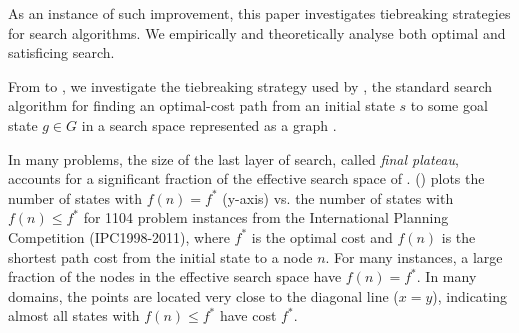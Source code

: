 As an instance of such improvement, this paper investigates tiebreaking
strategies for search algorithms. We empirically and theoretically
analyse both optimal and satisficing search.


From  to , we investigate
the tiebreaking strategy used by \astar, the standard search algorithm
for finding an optimal-cost path from an initial state $s$ to some goal
state $g \in G$ in a search space represented as a graph
\cite{hart1968formal}. 

In many problems, the size of the last layer of search, called
\emph{final plateau}, accounts for a significant fraction of the
effective search space of \astar.  
() plots the number of states with $f(n) = f^*$
(y-axis) vs. the number of states with $f(n) \leq f^*$ for 1104 problem
instances from the International Planning Competition (IPC1998-2011),
where $f^*$ is the optimal cost and $f(n)$ is the shortest path cost
from the initial state to a node $n$.  For many instances, a large
fraction of the nodes in the effective search space have $f(n)=f^*$.
In many domains, the points are located very close to the diagonal line
($x=y$), indicating almost all states with $f(n) \leq f^*$ have cost
$f^*$.



